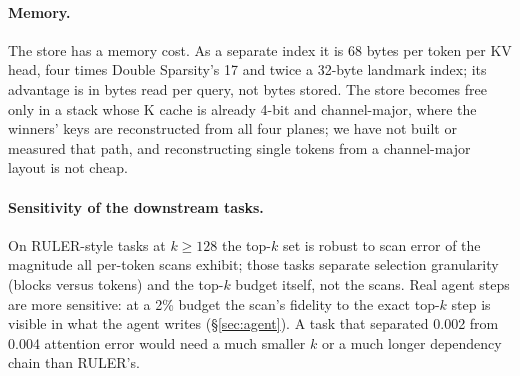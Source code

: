 \documentclass[10pt,twocolumn]{article}
\begin{document}
\paragraph{Memory.} The store has a memory cost. As a separate index it is 68 bytes per token per KV head, four times Double Sparsity's 17 and twice a 32-byte landmark index; its advantage is in bytes read per query, not bytes stored. The store becomes free only in a stack whose K cache is already 4-bit and channel-major, where the winners' keys are reconstructed from all four planes; we have not built or measured that path, and reconstructing single tokens from a channel-major layout is not cheap.

\paragraph{Sensitivity of the downstream tasks.} On RULER-style tasks at $k\ge 128$ the top-$k$ set is robust to scan error of the magnitude all per-token scans exhibit; those tasks separate selection granularity (blocks versus tokens) and the top-$k$ budget itself, not the scans. Real agent steps are more sensitive: at a 2\% budget the scan's fidelity to the exact top-$k$ step is visible in what the agent writes (\S\ref{sec:agent}). A task that separated 0.002 from 0.004 attention error would need a much smaller $k$ or a much longer dependency chain than RULER's.
\end{document}
